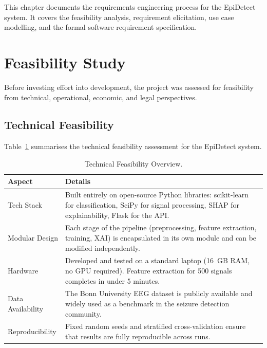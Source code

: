 
This chapter documents the requirements engineering process for the EpiDetect system. It covers the feasibility analysis, requirement elicitation, use case modelling, and the formal software requirement specification.

\section{Feasibility Study}

Before investing effort into development, the project was assessed for feasibility from technical, operational, economic, and legal perspectives.

\subsection{Technical Feasibility}

Table~\ref{tab:techfeas} summarises the technical feasibility assessment for the EpiDetect system.

\begin{table}[htbp]
\noindent
\renewcommand{\arraystretch}{1.25}
\caption{Technical Feasibility Overview.}
\label{tab:techfeas}
\begin{tabular}{|p{3.2cm}|p{8.3cm}|}
\hline
\textbf{Aspect} & \textbf{Details} \\
\hline
Tech Stack & Built entirely on open-source Python libraries: scikit-learn for classification, SciPy for signal processing, SHAP for explainability, Flask for the API. \\
\hline
Modular Design & Each stage of the pipeline (preprocessing, feature extraction, training, XAI) is encapsulated in its own module and can be modified independently. \\
\hline
Hardware & Developed and tested on a standard laptop (16~GB RAM, no GPU required). Feature extraction for 500 signals completes in under 5 minutes. \\
\hline
Data Availability & The Bonn University EEG dataset is publicly available and widely used as a benchmark in the seizure detection community. \\
\hline
Reproducibility & Fixed random seeds and stratified cross-validation ensure that results are fully reproducible across runs. \\
\hline
\end{tabular}
\end{table}

